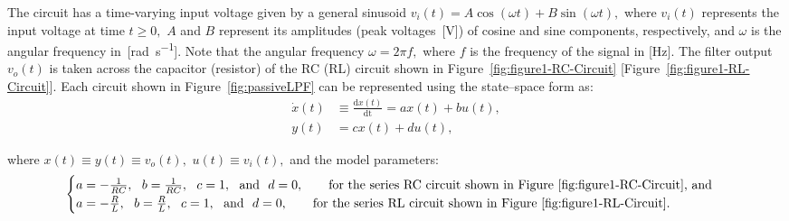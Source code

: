 %
The circuit has a time-varying input voltage given by a general sinusoid $v_i(t) =A\cos(\omega t) + B\sin(\omega t),$ where $v_i(t)$ represents the input voltage at time $t\ge 0,$ $A$ and $B$ represent its amplitudes (peak voltages~[\si{\volt}]) of  cosine and sine components, respectively, and $\omega$ is the angular frequency in~[\si{\radian\per\second}]. Note that the angular frequency $\omega = 2\pi f,$ where $f$ is the frequency of the signal in [\si{\hertz}]. The filter output $v_o(t)$ is taken across the  capacitor (resistor) of the RC (RL) circuit shown in Figure~\ref{fig:figure1-RC-Circuit} [Figure~\ref{fig:figure1-RL-Circuit}].  Each circuit shown in Figure~\ref{fig:passiveLPF} can be represented using the state--space form as: %
%
\begin{subequations}
  \label{eq:stateSpaceRC}
\begin{align}
        \dot x(t)&\equiv \frac{\mathrm{d}x(t)}{\mathrm{dt}} =ax(t) + bu(t),\\
        y(t)& = cx(t) + du(t),
      \end{align}  
\end{subequations}

where $x(t)\equiv y(t) \equiv v_o(t),$  $u(t) \equiv v_i(t),$ and the model parameters:
%
\begin{align*}
  \begin{cases}
    a=-\frac{1}{RC},~~b=\frac{1}{RC},~~c=1,~~\mathrm{and}~~d=0, \qquad\text{for the series RC circuit shown in Figure~\ref{fig:figure1-RC-Circuit}, and}\\
    a=-\frac{R}{L},~~b=\frac{R}{L},~~c=1,~~\mathrm{and}~~d=0, \qquad\text{for the series RL circuit shown in Figure~\ref{fig:figure1-RL-Circuit}.}    
  \end{cases}
\end{align*}

